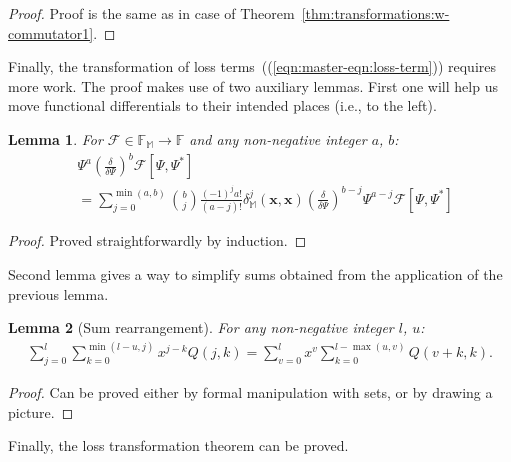 \documentclass[12pt,aip,jmp,amssymb,amsmath]{revtex4-1}
\newtheorem{lemma}{Lemma}
\begin{document}
\begin{proof}
Proof is the same as in case of Theorem~\ref{thm:transformations:w-commutator1}.
\end{proof}

Finally, the transformation of loss terms~((\ref{eqn:master-eqn:loss-term})) requires more work.
The proof makes use of two auxiliary lemmas.
First one will help us move functional differentials to their intended places (i.e., to the left).

\begin{lemma}
\label{lmm:transformations:swap-differential}
    For $\mathcal{F} \in \mathbb{F}_{\mathbb{M}} \rightarrow \mathbb{F}$ and any non-negative integer $a$, $b$:
    \begin{equation*}\begin{split}
    &    \Psi^a \left( \frac{\delta}{\delta \Psi} \right)^b \mathcal{F}[\Psi, \Psi^*] \\
    &    = \sum_{j=0}^{\min(a, b)}
            \binom{b}{j} \frac{(-1)^j a!}{(a - j)!}
            \delta_{\mathbb{M}}^j(\boldsymbol{x}, \boldsymbol{x})
            \left( \frac{\delta}{\delta \Psi} \right)^{b - j}
            \Psi^{a - j}
            \mathcal{F}[\Psi, \Psi^*]
    \end{split}\end{equation*}
\end{lemma}
\begin{proof}
Proved straightforwardly by induction.
\end{proof}

Second lemma gives a way to simplify sums obtained from the application of the previous lemma.

\begin{lemma}[Sum rearrangement]
\label{lmm:transformations:sum-rearrangement}
    For any non-negative integer $l$, $u$:
    \begin{equation*}\begin{split}
        \sum_{j=0}^l \sum_{k=0}^{\min(l-u,j)} x^{j-k} Q(j, k)
        = \sum_{v=0}^l x^v \sum_{k=0}^{l-\max(u,v)} Q(v + k, k).
    \end{split}\end{equation*}
\end{lemma}
\begin{proof}
Can be proved either by formal manipulation with sets, or by drawing a picture.
\end{proof}

Finally, the loss transformation theorem can be proved.
\end{document}
